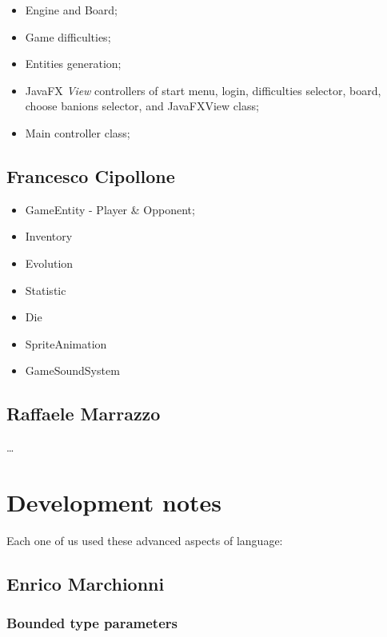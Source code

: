 \documentclass[12pt, a4paper]{report}
\theoremstyle{definition}
\begin{document}
    \begin{itemize}
        \item Engine and Board;
        \item Game difficulties;
        \item Entities generation;
        \item JavaFX \emph{View} controllers of start menu, login, difficulties selector, board, choose banions selector, and JavaFXView class;
        \item Main controller class;
    \end{itemize}

    \subsection*{Francesco Cipollone}

    \begin{itemize}
        \item GameEntity - Player \& Opponent;
        \item Inventory
        \item Evolution
        \item Statistic
        \item Die
        \item SpriteAnimation
        \item GameSoundSystem
    \end{itemize}

    \label{multimap}

    \subsection*{Raffaele Marrazzo}

    \dots

\section{Development notes}

    Each one of us used these advanced aspects of language:

    \subsection*{Enrico Marchionni}

        \subsubsection{Bounded type parameters}
\end{document}
